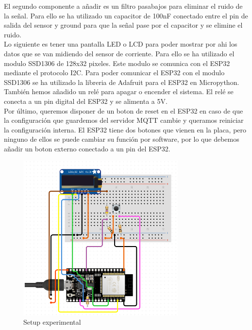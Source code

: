 \begin{titlepage}
El segundo componente a añadir es un filtro pasabajos para eliminar el ruido de la señal. Para ello se ha utilizado un capacitor de 100nF conectado entre el pin de salida del sensor y ground para que la señal pase por el capacitor y se elimine el ruido.\\

Lo siguiente es tener una pantalla LED o LCD para poder mostrar por ahi los datos que se van midiendo del sensor de corriente. Para ello se ha utilizado el modulo SSD1306 de 128x32 pixeles. Este modulo se comunica con el ESP32 mediante el protocolo I2C. Para poder comunicar el ESP32 con el modulo SSD1306 se ha utilizado la libreria de Adafruit para el ESP32 en Micropython.\\

También hemos añadido un relé para apagar o encender el sistema. El relé se conecta a un pin digital del ESP32 y se alimenta a 5V.\\

Por último, queremos disponer de un boton de reset en el ESP32 en caso de que la configuración que guardemos del servidor MQTT cambie y queramos reiniciar la configuración interna. El ESP32 tiene dos botones que vienen en la placa, pero ninguno de ellos se puede cambiar su función por software, por lo que debemos añadir un boton externo conectado a un pin del ESP32. \\

\begin{figure}[h!]
	\centering
	\includegraphics[width=0.75\textwidth]{imagenes/setup.png}
	\caption{Setup experimental}
\end{figure}

\end{titlepage}
